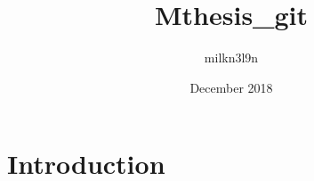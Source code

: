 \documentclass{article}
\title{Mthesis_git}
\author{milkn3l9n }
\date{December 2018}
\begin{document}
\maketitle

\section{Introduction}
\end{document}
